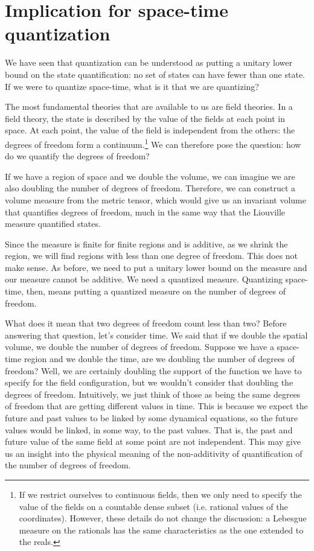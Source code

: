 \documentclass[10pt,twocolumn, nofootinbib]{revtex4-2}
\begin{document}
\section{Implication for space-time quantization}

We have seen that quantization can be understood as putting a unitary lower bound on the state quantification: no set of states can have fewer than one state. If we were to quantize space-time, what is it that we are quantizing?

The most fundamental theories that are available to us are field theories. In a field theory, the state is described by the value of the fields at each point in space. At each point, the value of the field is independent from the others: the degrees of freedom form a continuum.\footnote{If we restrict ourselves to continuous fields, then we only need to specify the value of the fields on a countable dense subset (i.e. rational values of the coordinates). However, these details do not change the discussion: a Lebesgue measure on the rationals has the same characteristics as the one extended to the reals.} We can therefore pose the question: how do we quantify the degrees of freedom?

If we have a region of space and we double the volume, we can imagine we are also doubling the number of degrees of freedom. Therefore, we can construct a volume measure from the metric tensor, which would give us an invariant volume that quantifies degrees of freedom, much in the same way that the Liouville measure quantified states.

Since the measure is finite for finite regions and is additive, as we shrink the region, we will find regions with less than one degree of freedom. This does not make sense. As before, we need to put a unitary lower bound on the measure and our measure cannot be additive. We need a quantized measure. Quantizing space-time, then, means putting a quantized measure on the number of degrees of freedom.

What does it mean that two degrees of freedom count less than two? Before answering that question, let's consider time. We said that if we double the spatial volume, we double the number of degrees of freedom. Suppose we have a space-time region and we double the time, are we doubling the number of degrees of freedom? Well, we are certainly doubling the support of the function we have to specify for the field configuration, but we wouldn't consider that doubling the degrees of freedom. Intuitively, we just think of those as being the same degrees of freedom that are getting different values in time. This is because we expect the future and past values to be linked by some dynamical equations, so the future values would be linked, in some way, to the past values. That is, the past and future value of the same field at some point are not independent. This may give us an insight into the physical meaning of the non-additivity of quantification of the number of degrees of freedom.
\end{document}
